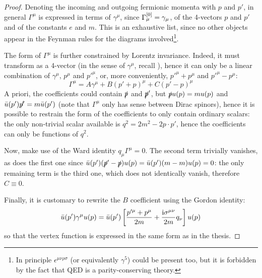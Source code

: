 \begin{proofbox}
  \begin{proof}
    Denoting the incoming and outgoing fermionic momenta with $ p $ and $ p' $, in general $ \Gamma^\mu $ is expressed in terms of $ \gamma^\mu $, since $ \Gamma^{[0]}_\mu = \gamma_\mu $, of the 4-vectors $ p $ and $ p' $ and of the constants $ e $ and $ m $. This is an exhaustive list, since no other objects appear in the Feynman rules for the diagrams involved\footnote{In principle $ \epsilon^{\mu \nu \rho \sigma} $ (or equivalently $ \gamma^5 $) could be present too, but it is forbidden by the fact that QED is a parity-conserving theory.}.

    The form of $ \Gamma^\mu $ is further constrained by Lorentz invariance. Indeed, it must transform as a 4-vector (in the sense of $ \gamma^\mu $, recall ), hence it can only be a linear combination of $ \gamma^\mu $, $ p^\mu $ and $ {p'}^\mu $, or, more conveniently, $ p'^\mu + p^\mu $ and $ p'^\mu - p^\mu $:
    \begin{equation*}
      \Gamma^\mu = A \gamma^\mu + B (p' + p)^\mu + C (p' - p)^\mu
    \end{equation*}
    A priori, the coefficients could contain $ \slashed{p} $ and $ \slashed{p}' $, but $ \slashed{p} u(p) = m u(p) $ and $ \bar{u}(p') \slashed{p'} = m \bar{u}(p') $ (note that $ \Gamma^\mu $ only has sense between Dirac spinors), hence it is possible to restrain the form of the coefficients to only contain ordinary scalars: the only non-trivial scalar available is $ q^2 = 2m^2 -2 p \cdot p' $, hence the coefficients can only be functions of $ q^2 $.

    Now, make use of the Ward identity $ q_\mu \Gamma^\mu = 0 $. The second term trivially vanishes, as does the first one since $ \bar{u}(p') (\slashed{p}' - \slashed{p}) u(p) = \bar{u}(p') (m - m) u(p) = 0 $: the only remaining term is the third one, which does not identically vanish, therefore $ C \equiv 0 $.

    Finally, it is customary to rewrite the $ B $ coefficient using the Gordon identity:
    \begin{equation}
      \bar{u}(p') \gamma^\mu u(p) = \bar{u}(p') \left[ \frac{p'^\mu + p^\mu}{2m} + \frac{\mathrm{i} \sigma^{\mu \nu}}{2m} q_\nu \right] u(p)
    \end{equation}
    so that the vertex function is expressed in the same form as in the thesis.
  \end{proof}
\end{proofbox}


